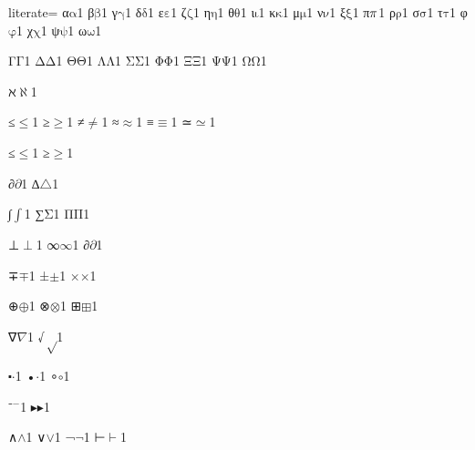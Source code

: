 {%
literate=
{α}{{\ensuremath{\mathrm{\alpha}}}}1
{β}{{\ensuremath{\mathrm{\beta}}}}1
{γ}{{\ensuremath{\mathrm{\gamma}}}}1
{δ}{{\ensuremath{\mathrm{\delta}}}}1
{ε}{{\ensuremath{\mathrm{\varepsilon}}}}1
{ζ}{{\ensuremath{\mathrm{\zeta}}}}1
{η}{{\ensuremath{\mathrm{\eta}}}}1
{θ}{{\ensuremath{\mathrm{\theta}}}}1
{ι}{{\ensuremath{\mathrm{\iota}}}}1
{κ}{{\ensuremath{\mathrm{\kappa}}}}1
{μ}{{\ensuremath{\mathrm{\mu}}}}1
{ν}{{\ensuremath{\mathrm{\nu}}}}1
{ξ}{{\ensuremath{\mathrm{\xi}}}}1
{π}{{\ensuremath{\mathrm{\mathnormal{\pi}}}}}1
{ρ}{{\ensuremath{\mathrm{\rho}}}}1
{σ}{{\ensuremath{\mathrm{\sigma}}}}1
{τ}{{\ensuremath{\mathrm{\tau}}}}1
{φ}{{\ensuremath{\mathrm{\varphi}}}}1
{χ}{{\ensuremath{\mathrm{\chi}}}}1
{ψ}{{\ensuremath{\mathrm{\psi}}}}1
{ω}{{\ensuremath{\mathrm{\omega}}}}1

{Γ}{{\ensuremath{\mathrm{\Gamma}}}}1
{Δ}{{\ensuremath{\mathrm{\Delta}}}}1
{Θ}{{\ensuremath{\mathrm{\Theta}}}}1
{Λ}{{\ensuremath{\mathrm{\Lambda}}}}1
{Σ}{{\ensuremath{\mathrm{\Sigma}}}}1
{Φ}{{\ensuremath{\mathrm{\Phi}}}}1
{Ξ}{{\ensuremath{\mathrm{\Xi}}}}1
{Ψ}{{\ensuremath{\mathrm{\Psi}}}}1
{Ω}{{\ensuremath{\mathrm{\Omega}}}}1

{ℵ}{{\ensuremath{\aleph}}}1

{≤}{{\ensuremath{\leq}}}1
{≥}{{\ensuremath{\geq}}}1
{≠}{{\ensuremath{\neq}}}1
{≈}{{\ensuremath{\approx}}}1
{≡}{{\ensuremath{\equiv}}}1
{≃}{{\ensuremath{\simeq}}}1

{≤}{{\ensuremath{\leq}}}1
{≥}{{\ensuremath{\geq}}}1

{∂}{{\ensuremath{\partial}}}1
{∆}{{\ensuremath{\triangle}}}1 %

{∫}{{\ensuremath{\int}}}1
{∑}{{\ensuremath{\mathrm{\Sigma}}}}1
{Π}{{\ensuremath{\mathrm{\Pi}}}}1

{⊥}{{\ensuremath{\perp}}}1
{∞}{{\ensuremath{\infty}}}1
{∂}{{\ensuremath{\partial}}}1

{∓}{{\ensuremath{\mp}}}1
{±}{{\ensuremath{\pm}}}1
{×}{{\ensuremath{\times}}}1

{⊕}{{\ensuremath{\oplus}}}1
{⊗}{{\ensuremath{\otimes}}}1
{⊞}{{\ensuremath{\boxplus}}}1

{∇}{{\ensuremath{\nabla}}}1
{√}{{\ensuremath{\sqrt}}}1

{⬝}{{\ensuremath{\cdot}}}1
{•}{{\ensuremath{\cdot}}}1
{∘}{{\ensuremath{\circ}}}1

{⁻}{{\ensuremath{^{-}}}}1
{▸}{{\ensuremath{\blacktriangleright}}}1

{∧}{{\ensuremath{\wedge}}}1
{∨}{{\ensuremath{\vee}}}1
{¬}{{\ensuremath{\neg}}}1
{⊢}{{\color{tacticcolor}\ensuremath{\vdash}}}1

}
